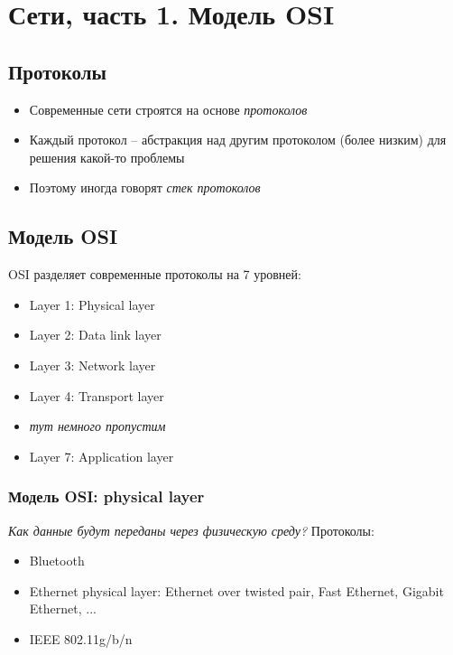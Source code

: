 \section{Сети, часть 1. Модель OSI}
  \subsection{Протоколы}
    \begin{itemize}
      \item Современные сети строятся на основе \textit{протоколов}
      \item Каждый протокол -- абстракция над другим протоколом (более низким) для решения какой-то проблемы
      \item Поэтому иногда говорят \textit{стек протоколов}
    \end{itemize}
  
  \subsection{Модель OSI}
  OSI разделяет современные протоколы на 7 уровней:
  \begin{itemize}
    \item Layer 1: Physical layer
    \item Layer 2: Data link layer
    \item Layer 3: Network layer
    \item Layer 4: Transport layer
    \item \textit{тут немного пропустим}
    \item Layer 7: Application layer
  \end{itemize}
  
  \subsubsection{Модель OSI: physical layer}
    \textit{Как данные будут переданы через физическую среду?}
    Протоколы:
    \begin{itemize}
      \item Bluetooth
      \item Ethernet physical layer: Ethernet over twisted pair, Fast Ethernet, Gigabit Ethernet, ...
      \item IEEE 802.11g/b/n
    \end{itemize}
  
